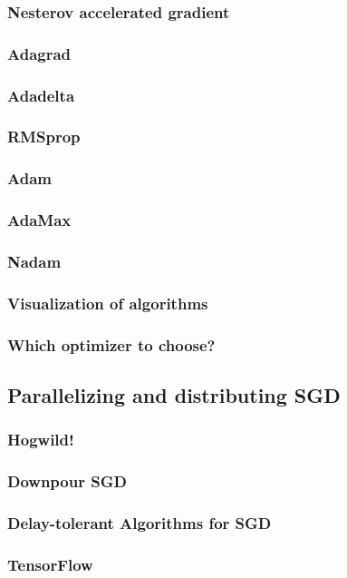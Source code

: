 \documentclass[10pt,a4paper]{ctexbook}
\begin{document}
\subsubsection{Nesterov accelerated gradient}
\subsubsection{Adagrad}
\subsubsection{Adadelta}
\subsubsection{RMSprop}
\subsubsection{Adam}
\subsubsection{AdaMax}
\subsubsection{Nadam}
\subsubsection{Visualization of algorithms}
\subsubsection{Which optimizer to choose?}

\subsection{Parallelizing and distributing SGD}
\subsubsection{Hogwild!}
\subsubsection{Downpour SGD}
\subsubsection{Delay-tolerant Algorithms for SGD}
\subsubsection{TensorFlow}
\end{document}
